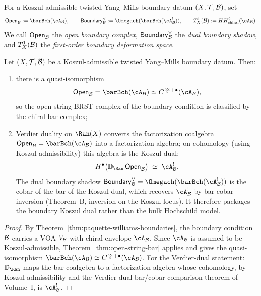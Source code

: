 \begin{notation}
\label{not:twisted-ym-boundary-objects}
For a Koszul-admissible twisted Yang--Mills boundary datum $(X,\mathcal{T},\mathcal{B})$, set
\[
\mathsf{Open}_{\cB} := \barBch(\cA_{\cB}),
\qquad
\mathsf{Boundary}^{\vee}_{\cB} := \Omegach(\barBch(\cA_{\cB}^!)),
\qquad
T^1_X(\cB) := HH^2_{\mathrm{chiral}}(\cA_{\cB}).
\]
We call $\mathsf{Open}_{\mathcal{B}}$ the \emph{open boundary complex},
$\mathsf{Boundary}^{\vee}_{\mathcal{B}}$ the \emph{dual boundary shadow},
and $T^1_X(\mathcal{B})$ the \emph{first-order boundary deformation space}.
\end{notation}

\begin{theorem}
Let $(X,\mathcal{T},\mathcal{B})$ be a Koszul-admissible twisted Yang--Mills boundary datum.
Then:
\begin{enumerate}[label=(\alph*)]
\item there is a quasi-isomorphism
\[
\mathsf{Open}_{\cB} = \barBch(\cA_{\cB}) \simeq C^{\frac{\infty}{2}+\bullet}(\cA_{\cB}),
\]
so the open-string BRST complex of the boundary condition is classified by the chiral bar complex;
\item Verdier duality on $\Ran(X)$ converts the factorization
coalgebra $\mathsf{Open}_{\cB} = \barBch(\cA_{\cB})$ into a
factorization algebra; on cohomology (using Koszul-admissibility)
this algebra is the Koszul dual:
\[
H^\bullet\bigl(\mathbb{D}_{\Ran}\, \mathsf{Open}_{\cB}\bigr)
\;\simeq\; \cA_{\cB}^!.
\]
The dual boundary shadow $\mathsf{Boundary}^{\vee}_{\cB} = \Omegach(\barBch(\cA_{\cB}^!))$
is the cobar of the bar of the Koszul dual, which recovers
$\cA_{\cB}^!$ by bar-cobar inversion (Theorem~B, inversion on the Koszul locus). It therefore
packages the boundary Koszul dual rather than the bulk Hochschild
model.
\end{enumerate}
\end{theorem}

\begin{proof}
By Theorem~\ref{thm:paquette-williams-boundaries}, the boundary condition $\mathcal{B}$ carries a
VOA $V_{\mathcal{B}}$ with chiral envelope $\cA_{\cB}$. Since $\cA_{\cB}$ is assumed to be
Koszul-admissible, Theorem~\ref{thm:open-string-bar} applies and gives the quasi-isomorphism
$\barBch(\cA_{\cB}) \simeq C^{\frac{\infty}{2}+\bullet}(\cA_{\cB})$.
For the Verdier-dual statement: $\mathbb{D}_{\Ran}$ maps the
bar coalgebra to a factorization algebra whose cohomology, by
Koszul-admissibility and the Verdier-dual bar/cobar comparison theorem of Volume~I,
is $\cA_{\cB}^!$.
\end{proof}

